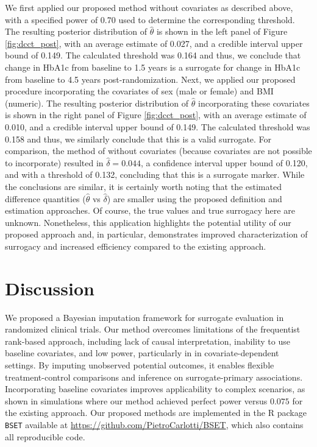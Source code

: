 \documentclass[12pt]{article}
\begin{document}
We first applied our proposed method without covariates as described above, with a specified power of 0.70 used to determine the corresponding threshold. The resulting posterior distribution of $\widehat{\theta}$ is shown in the left panel of Figure \ref{fig:dcct_post}, with an average estimate of 0.027, and a credible interval upper bound of 0.149. The calculated threshold was 0.164 and thus, we conclude that change in HbA1c from baseline to 1.5 years is a surrogate for change in HbA1c from baseline to 4.5 years post-randomization. Next, we applied our proposed procedure incorporating the covariates of sex (male or female) and BMI (numeric). The resulting posterior distribution of $\widehat{\theta}$ incorporating these covariates is shown in the right panel of Figure \ref{fig:dcct_post}, with an average estimate of 0.010, and a credible interval upper bound of 0.149. The calculated threshold was 0.158 and thus, we similarly conclude that this is a valid surrogate. For comparison, the method of \citet{parast2024rank} without covariates (because covariates are not possible to incorporate) resulted in $\widehat{\delta} = 0.044$, a confidence interval upper bound of 0.120, and with a threshold of 0.132, concluding that this is a surrogate marker. While the conclusions are similar, it is certainly worth noting that the estimated difference quantities ($\widehat{\theta}$ vs $\widehat{\delta}$) are smaller using the proposed definition and estimation approaches. Of course, the true values and true surrogacy here are unknown. Nonetheless, this application highlights the potential utility of our proposed approach and, in particular, demonstrates improved characterization of surrogacy and increased efficiency compared to the existing approach.


\section{Discussion}\label{sec:discussion}

We proposed a Bayesian imputation framework for surrogate evaluation in randomized clinical trials. Our method overcomes limitations of the frequentist rank-based approach, including lack of causal interpretation, inability to use baseline covariates, and low power, particularly in  in covariate-dependent settings. By imputing unobserved potential outcomes, it enables flexible treatment-control comparisons and inference on surrogate-primary associations. Incorporating baseline covariates improves applicability to complex scenarios, as shown in simulations where our method achieved perfect power versus \(0.075\) for the existing approach. Our proposed methods are implemented in the R package \texttt{BSET} available at \url{https://github.com/PietroCarlotti/BSET}, which also contains all reproducible code.
\end{document}
